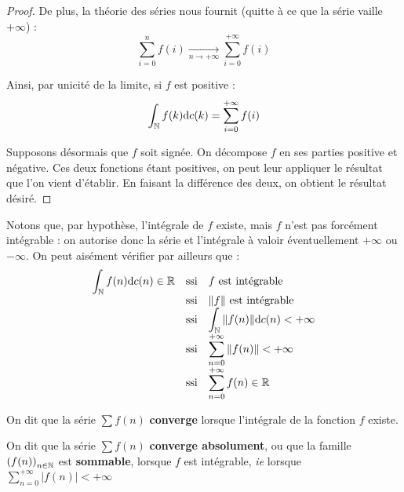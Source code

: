 \documentclass[../integ-proba.tex]{subfiles}
\begin{document}
\begin{proof}
        De plus, la théorie des séries nous fournit (quitte à ce que la série vaille $+\infty$) :
        \begin{displaymath}
            \sum_{i=0}^n f(i) \xrightarrow[n \to + \infty]{} \sum_{i=0}^{+\infty} f(i)
        \end{displaymath}

        Ainsi, par unicité de la limite, si $f$ est positive :
        \begin{displaymath}
            \int_{\mathbb{N}} f(k)\text{d}c(k) = \sum_{i=0}^{+\infty} f(i)
        \end{displaymath}

        Supposons désormais que $f$ soit signée.
        On décompose $f$ en ses parties positive et négative.
        Ces deux fonctions étant positives, on peut leur appliquer le résultat que l'on vient d'établir.
        En faisant la différence des deux, on obtient le résultat désiré.
    \end{proof}

    \begin{rem}
        Notons que, par hypothèse, l'intégrale de $f$ existe, mais $f$ n'est pas forcément intégrable : on autorise donc la série et l'intégrale à valoir éventuellement $+\infty$ ou $-\infty$.
        On peut aisément vérifier par ailleurs que :
        \begin{displaymath}
            {
        \everymath={\displaystyle}
        \begin{array}{rcl}
            \int_\N f(n) \text{d} c(n) \in \R & \text{ssi} & f \text{ est intégrable } \\
                                                              & \text{ssi} & \|f\| \text{ est intégrable} \\
                                                              & \text{ssi} & \int_\N \|f(n)\| \text{d} c(n) < + \infty \\
                                                              & \text{ssi} & \sum_{n=0}^{+ \infty} \|f(n)\| < + \infty \\
                                                              & \text{ssi} & \sum_{n=0}^{+ \infty} f(n) \in \R
        \end{array}
        }
        \end{displaymath}
    \end{rem}

    \begin{defi}
        On dit que la série $\sum f(n)$ \textbf{converge} lorsque l'intégrale de la fonction $f$ existe.

        On dit que la série $\sum f(n)$ \textbf{converge absolument}, ou que la famille $\left(f(n)\right)_{n \in \mathbb{N}}$ est \textbf{sommable}, lorsque $f$ est intégrable, \textit{ie} lorsque $\sum_{n=0}^{+ \infty} \left|f(n)\right| < + \infty$
    \end{defi}
\end{document}
